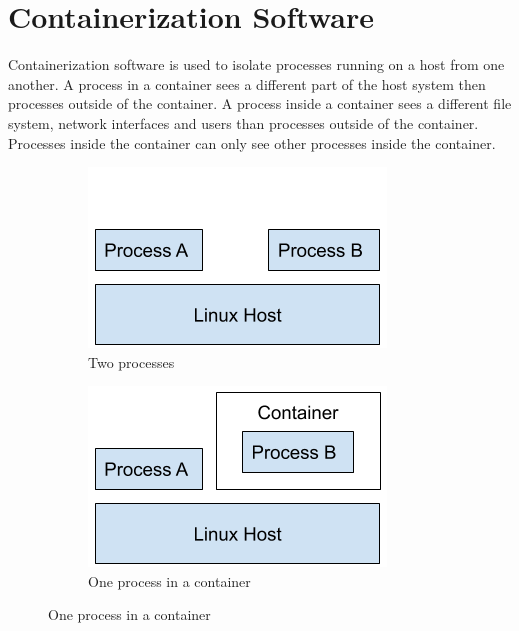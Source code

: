 \section{Containerization Software}
Containerization software is used to isolate processes running on a host from one another.
A process in a container sees a different part of the host system then processes outside of the container. A process inside a container sees a different file system, network interfaces and users than processes outside of the container. Processes inside the container can only see other processes inside the container.

\begin{figure}[ht]
    \begin{subfigure}{.45\textwidth}
        \centering
        \includegraphics[width=.8\linewidth]{resources/images/no-containers.png}
        \caption{Two processes}
    \end{subfigure}
    \begin{subfigure}{.45\textwidth}
        \centering
        \includegraphics[width=.8\linewidth]{resources/images/container.png}
        \caption{One process in a container}
    \end{subfigure}
\end{figure}

